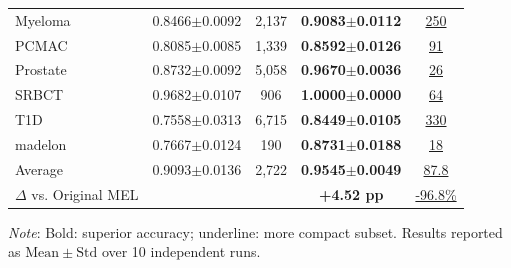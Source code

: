 \begin{table}[!htb]
\begin{tabular*}{\columnwidth}{@{\extracolsep{\fill}}lcccc@{}}
Myeloma          & 0.8466$\pm$0.0092 & 2{,}137 & \textbf{0.9083$\pm$0.0112} & \underline{250} \\
PCMAC            & 0.8085$\pm$0.0085 & 1{,}339 & \textbf{0.8592$\pm$0.0126} & \underline{91} \\
Prostate         & 0.8732$\pm$0.0092 & 5{,}058 & \textbf{0.9670$\pm$0.0036} & \underline{26} \\
SRBCT            & 0.9682$\pm$0.0107 &      906 & \textbf{1.0000$\pm$0.0000} & \underline{64} \\
T1D              & 0.7558$\pm$0.0313 & 6{,}715 & \textbf{0.8449$\pm$0.0105} & \underline{330} \\
madelon          & 0.7667$\pm$0.0124 &      190 & \textbf{0.8731$\pm$0.0188} & \underline{18} \\
\midrule
Average          & 0.9093$\pm$0.0136 & 2{,}722 & \textbf{0.9545$\pm$0.0049} & \underline{87.8} \\
$\Delta$ vs. Original MEL & & & \textbf{+4.52 pp} & \underline{-96.8\%} \\
\bottomrule
\end{tabular*}
\vspace{2pt}
\par\raggedright\footnotesize
\textit{Note}: Bold: superior accuracy; underline: more compact subset. Results reported as $\mathrm{Mean} \pm \mathrm{Std}$ over 10 independent runs.
\end{table}
